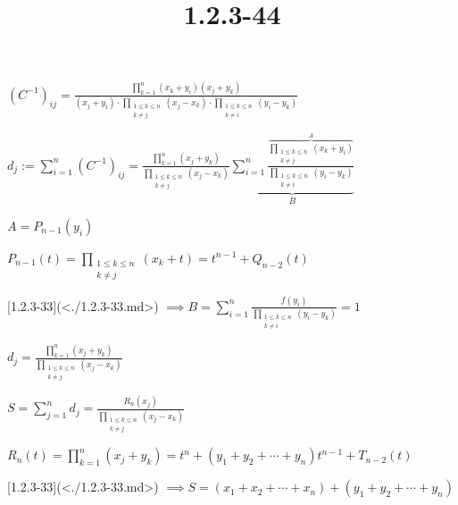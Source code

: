 \documentclass{article}
\title{1.2.3-44}
\begin{document}
\maketitle

$(C^{-1})_{ij} = \frac{\prod_{k=1}^n(x_k + y_i)(x_j+y_k)}{(x_j+y_i) \cdot \prod_{\substack{1 \leq k \leq n\\ k \neq j}} (x_j-x_k) \cdot \prod_{\substack{1 \leq k \leq n\\ k \neq i}} (y_i-y_k)}$

$d_j := \sum_{i=1}^n (C^{-1})_{ij} = \frac{\prod_{k=1}^n (x_j+y_k)}{\prod_{\substack{1 \leq k \leq n\\ k \neq j}} (x_j-x_k)} \underbrace{\sum_{i=1}^n\frac{\overbrace{\prod_{\substack{1 \leq k \leq n\\k \neq j}}(x_k + y_i)}^A}{\prod_{\substack{1 \leq k \leq n\\ k \neq i}} (y_i-y_k)}}_B$

$A = P_{n-1}(y_i)$

$P_{n-1}(t) = \prod_{\substack{1 \leq k \leq n\\k \neq j}}(x_k + t) = t^{n-1} + Q_{n-2}(t)$

[1.2.3-33](<./1.2.3-33.md>) $\implies B = \sum_{i=1}^n\frac{f(y_i)}{\prod_{\substack{1 \leq k \leq n\\ k \neq i}} (y_i-y_k)} = 1$

$d_j = \frac{\prod_{k=1}^n (x_j+y_k)}{\prod_{\substack{1 \leq k \leq n\\ k \neq j}} (x_j-x_k)}$

$S = \sum_{j=1}^n d_j = \frac{R_n(x_j)}{\prod_{\substack{1 \leq k \leq n\\ k \neq j}} (x_j-x_k)}$

$R_n(t) = \prod_{k=1}^n (x_j+y_k) = t^n + (y_1+y_2+\cdots+y_n)t^{n-1} + T_{n-2}(t)$

[1.2.3-33](<./1.2.3-33.md>) $\implies S = (x_1+x_2+\cdots+x_n) + (y_1+y_2+\cdots+y_n)$
\end{document}
